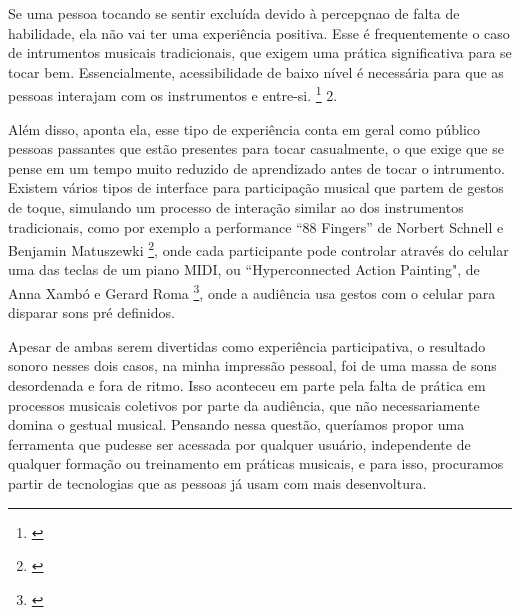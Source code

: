 \begin{citacao}
Se uma pessoa tocando se sentir excluída devido à percepçnao de falta de habilidade, ela não vai ter uma experiência positiva. Esse é frequentemente o caso de intrumentos musicais tradicionais, que exigem uma prática significativa para se tocar bem. Essencialmente, acessibilidade de baixo nível é necessária para que as pessoas interajam com os instrumentos e entre-si. \footnote{\citeyear{Blaine2003}}
2.
\end{citacao}

Além disso, aponta ela, esse tipo de experiência conta em geral como público pessoas passantes que estão presentes para tocar casualmente, o que exige que se pense em um tempo muito reduzido de aprendizado antes de tocar o intrumento. Existem vários tipos de interface para participação musical que partem de gestos de toque, simulando um processo de interação similar ao dos instrumentos tradicionais, como por exemplo a performance ``88 Fingers'' de Norbert Schnell e Benjamin Matuszewki \footnote{\cite{Schnell2017}}, onde cada participante pode controlar através do celular uma das teclas de um piano MIDI, ou ``Hyperconnected Action Painting", de Anna Xambó e Gerard Roma \footnote{\cite{Xambo2017}}, onde a audiência usa gestos com o celular para disparar sons pré definidos. 

Apesar de ambas serem divertidas como experiência participativa, o resultado sonoro nesses dois casos, na minha impressão pessoal, foi de uma massa de sons desordenada e fora de ritmo. Isso aconteceu em parte pela falta de prática em processos musicais coletivos por parte da audiência, que não necessariamente domina o gestual musical. Pensando nessa questão, queríamos propor uma ferramenta que pudesse ser acessada por qualquer usuário, independente de qualquer formação ou treinamento em práticas musicais, e para isso, procuramos partir de tecnologias que as pessoas já usam com mais desenvoltura.

